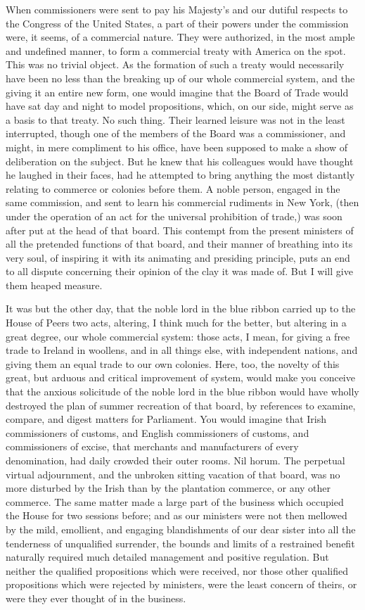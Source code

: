 When commissioners were sent to pay his Majesty's and our dutiful respects to the Congress of the United States, a part of their powers under the commission were, it seems, of a commercial nature. They were authorized, in the most ample and undefined manner, to form a commercial treaty with America on the spot. This was no trivial object. As the formation of such a treaty would necessarily have been no less than the breaking up of our whole commercial system, and the giving it an entire new form, one would imagine that the Board of Trade would have sat day and night to model propositions, which, on our side, might serve as a basis to that treaty. No such thing. Their learned leisure was not in the least interrupted, though one of the members of the Board was a commissioner, and might, in mere compliment to his office, have been supposed to make a show of deliberation on the subject. But he knew that his colleagues would have thought he laughed in their faces, had he attempted to bring anything the most distantly relating to commerce or colonies before them. A noble person, engaged in the same commission, and sent to learn his commercial rudiments in New York, (then under the operation of an act for the universal prohibition of trade,) was soon after put at the head of that board. This contempt from the present ministers of all the pretended functions of that board, and their manner of breathing into its very soul, of inspiring it with its animating and presiding principle, puts an end to all dispute concerning their opinion of the clay it was made of. But I will give them heaped measure.

It was but the other day, that the noble lord in the blue ribbon carried up to the House of Peers two acts, altering, I think much for the better, but altering in a great degree, our whole commercial system: those acts, I mean, for giving a free trade to Ireland in woollens, and in all things else, with independent nations, and giving them an equal trade to our own colonies. Here, too, the novelty of this great, but arduous and critical improvement of system, would make you conceive that the anxious solicitude of the noble lord in the blue ribbon would have wholly destroyed the plan of summer recreation of that board, by references to examine, compare, and digest matters for Parliament. You would imagine that Irish commissioners of customs, and English commissioners of customs, and commissioners of excise, that merchants and manufacturers of every denomination, had daily crowded their outer rooms. Nil horum. The perpetual virtual adjournment, and the unbroken sitting vacation of that board, was no more disturbed by the Irish than by the plantation commerce, or any other commerce. The same matter made a large part of the business which occupied the House for two sessions before; and as our ministers were not then mellowed by the mild, emollient, and engaging blandishments of our dear sister into all the tenderness of unqualified surrender, the bounds and limits of a restrained benefit naturally required much detailed management and positive regulation. But neither the qualified propositions which were received, nor those other qualified propositions which were rejected by ministers, were the least concern of theirs, or were they ever thought of in the business.

